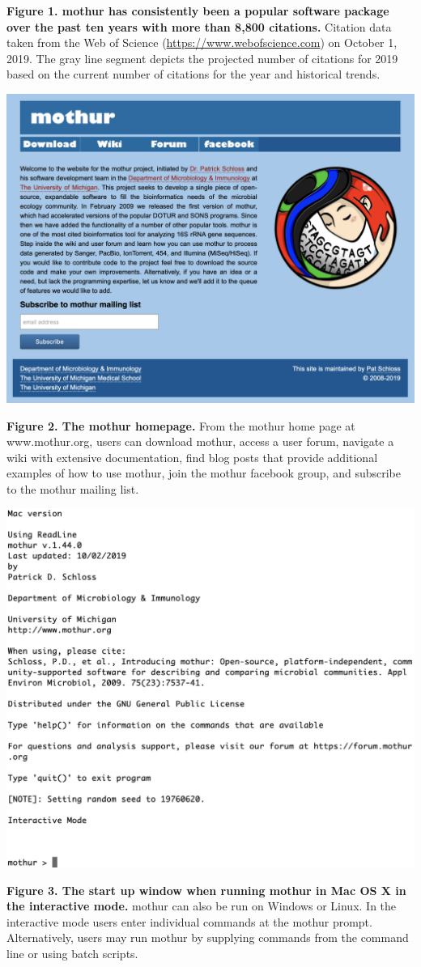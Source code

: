 \documentclass[11pt,]{article}
\begin{document}
\textbf{Figure 1. mothur has consistently been a popular software
package over the past ten years with more than 8,800 citations.}
Citation data taken from the Web of Science
(\url{https://www.webofscience.com}) on October 1, 2019. The gray line
segment depicts the projected number of citations for 2019 based on the
current number of citations for the year and historical trends.

\newpage

\includegraphics{figure_2.png}

\textbf{Figure 2. The mothur homepage.} From the mothur home page at
www.mothur.org, users can download mothur, access a user forum, navigate
a wiki with extensive documentation, find blog posts that provide
additional examples of how to use mothur, join the mothur facebook
group, and subscribe to the mothur mailing list.

\newpage

\includegraphics{figure_3.png}

\textbf{Figure 3. The start up window when running mothur in Mac OS X in
the interactive mode.} mothur can also be run on Windows or Linux. In
the interactive mode users enter individual commands at the mothur
prompt. Alternatively, users may run mothur by supplying commands from
the command line or using batch scripts.
\end{document}
